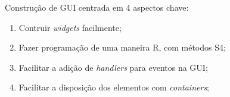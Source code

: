 
\begin{frame}
  Construção de GUI centrada em 4 aspectos chave:
  \begin{enumerate}
  \item Contruir \textit{widgets} facilmente;
  \item Fazer programação de uma maneira R, com métodos S4;
  \item Facilitar a adição de \textit{handlers} para eventos na GUI;
  \item Facilitar a disposição dos elementos com \textit{containers};
  \end{enumerate}
\end{frame}


\begin{center}
\end{center}

